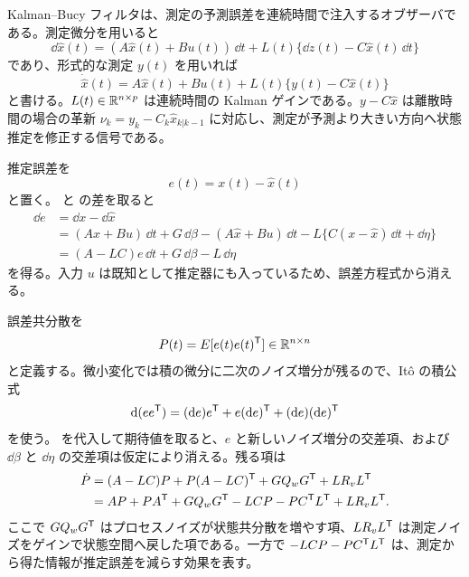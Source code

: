Kalman--Bucy フィルタは、測定の予測誤差を連続時間で注入するオブザーバである。測定微分を用いると
\begin{equation}
  \dd\hat{x}(t)
  =(A\hat{x}(t)+Bu(t))\,\dd t
  +L(t)\{\dd z(t)-C\hat{x}(t)\,\dd t\}
  \label{eq:kb-filter-differential}
\end{equation}
であり、形式的な測定 $y(t)$ を用いれば
\begin{equation}
  \dot{\hat{x}}(t)
  =A\hat{x}(t)+Bu(t)+L(t)\{y(t)-C\hat{x}(t)\}
  \label{eq:kb-filter-formal}
\end{equation}
と書ける。$L(t)\in\mathbb{R}^{n\times p}$ は連続時間の Kalman ゲインである。$y-C\hat{x}$ は離散時間の場合の革新 $\nu_k=y_k-C_k\hat{x}_{k|k-1}$ に対応し、測定が予測より大きい方向へ状態推定を修正する信号である。

\begin{derivation}
推定誤差を
\begin{equation}
  e(t)=x(t)-\hat{x}(t)
\end{equation}
と置く。 と  の差を取ると
\begin{align}
  \dd e
  &=\dd x-\dd\hat{x}\\
  &=(Ax+Bu)\,\dd t+G\,\dd\beta
    -(A\hat{x}+Bu)\,\dd t
    -L\{C(x-\hat{x})\,\dd t+\dd\eta\}\\
  &=(A-LC)e\,\dd t+G\,\dd\beta-L\,\dd\eta
  \label{eq:kb-error-dynamics}
\end{align}
を得る。入力 $u$ は既知として推定器にも入っているため、誤差方程式から消える。

誤差共分散を
\begin{equation}
  P(t)=E[e(t)e(t)^{\mathsf{T}}]\in\mathbb{R}^{n\times n}
\end{equation}
と定義する。微小変化では積の微分に二次のノイズ増分が残るので、Itô の積公式
\begin{equation}
  \mathrm{d}(ee^{\mathsf{T}})=(\mathrm{d} e)e^{\mathsf{T}}+e(\mathrm{d} e)^{\mathsf{T}}+(\mathrm{d} e)(\mathrm{d} e)^{\mathsf{T}}
\end{equation}
を使う。 を代入して期待値を取ると、$e$ と新しいノイズ増分の交差項、および $\dd\beta$ と $\dd\eta$ の交差項は仮定により消える。残る項は
\begin{align}
  \dot{P}
  &=(A-LC)P+P(A-LC)^{\mathsf{T}}
    +GQ_wG^{\mathsf{T}}+LR_vL^{\mathsf{T}}\\
  &=AP+PA^{\mathsf{T}}+GQ_wG^{\mathsf{T}}
    -LCP-PC^{\mathsf{T}} L^{\mathsf{T}}+LR_vL^{\mathsf{T}}.
  \label{eq:kb-covariance-for-gain}
\end{align}
ここで $GQ_wG^{\mathsf{T}}$ はプロセスノイズが状態共分散を増やす項、$LR_vL^{\mathsf{T}}$ は測定ノイズをゲインで状態空間へ戻した項である。一方で $-LCP-PC^{\mathsf{T}} L^{\mathsf{T}}$ は、測定から得た情報が推定誤差を減らす効果を表す。


\end{derivation}
